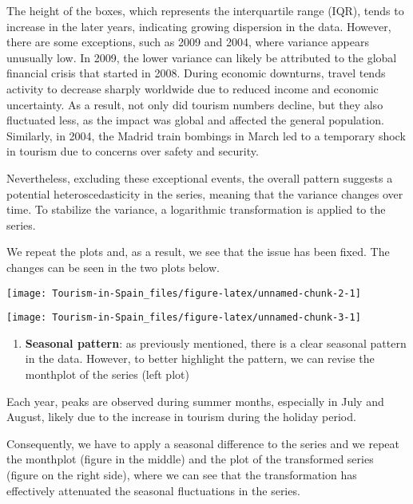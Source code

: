 \documentclass[
]{article}
\providecommand{\tightlist}{%
  \setlength{\itemsep}{0pt}\setlength{\parskip}{0pt}}
\begin{document}
The height of the boxes, which represents the interquartile range (IQR),
tends to increase in the later years, indicating growing dispersion in
the data. However, there are some exceptions, such as 2009 and 2004,
where variance appears unusually low. In 2009, the lower variance can
likely be attributed to the global financial crisis that started in
2008. During economic downturns, travel tends activity to decrease
sharply worldwide due to reduced income and economic uncertainty. As a
result, not only did tourism numbers decline, but they also fluctuated
less, as the impact was global and affected the general population.
Similarly, in 2004, the Madrid train bombings in March led to a
temporary shock in tourism due to concerns over safety and security.

Nevertheless, excluding these exceptional events, the overall pattern
suggests a potential heteroscedasticity in the series, meaning that the
variance changes over time. To stabilize the variance, a logarithmic
transformation is applied to the series.

We repeat the plots and, as a result, we see that the issue has been
fixed. The changes can be seen in the two plots below.

\begin{center}\texttt{[image: Tourism-in-Spain\_files/figure-latex/unnamed-chunk-2-1]} \end{center}

\begin{center}\texttt{[image: Tourism-in-Spain\_files/figure-latex/unnamed-chunk-3-1]} \end{center}

\begin{enumerate}
\def\labelenumi{\arabic{enumi}.}
\setcounter{enumi}{1}
\tightlist
\item
  \textbf{Seasonal pattern}: as previously mentioned, there is a clear
  seasonal pattern in the data. However, to better highlight the
  pattern, we can revise the monthplot of the series (left plot)
\end{enumerate}

Each year, peaks are observed during summer months, especially in July
and August, likely due to the increase in tourism during the holiday
period.

Consequently, we have to apply a seasonal difference to the series and
we repeat the monthplot (figure in the middle) and the plot of the
transformed series (figure on the right side), where we can see that the
transformation has effectively attenuated the seasonal fluctuations in
the series.
\end{document}
